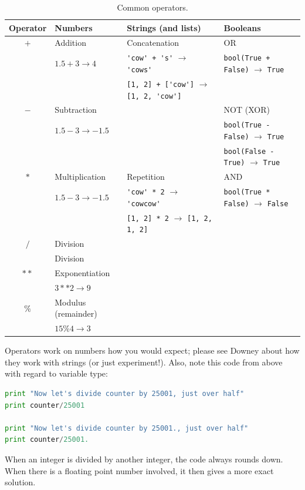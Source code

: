\documentclass[a4paper,10pt]{scrartcl}
\begin{document}
\begin{table}[!h]
\scriptsize
\begin{tabular}{clll}
Operator	& Numbers			& Strings (and lists)							& Booleans \\
\hline
$+$		& Addition			& Concatenation								&	OR 							\\
		& $1.5 + 3 \rightarrow 4$	& {\lstinline!'cow' + 's'!} $\rightarrow$ {\lstinline!'cows'!}		& {\lstinline!bool(True + False)!} $\rightarrow$ {\lstinline!True!} \\
		& 				& {\lstinline![1, 2] + ['cow']!} $\rightarrow$ {\lstinline![1, 2, 'cow']!}	& 								\\
$-$		& Subtraction			&									& 	NOT (XOR)						\\
		& $1.5 - 3 \rightarrow -1.5$	& 									& {\lstinline!bool(True - False)!} $\rightarrow$ {\lstinline!True!} \\
		& 				& 									& {\lstinline!bool(False - True)!} $\rightarrow$ {\lstinline!True!} \\
$*$		& Multiplication		& Repetition								& 	AND							\\
		& $1.5 - 3 \rightarrow -1.5$	& {\lstinline!'cow' * 2!} $\rightarrow$ {\lstinline!'cowcow'!}		& {\lstinline!bool(True * False)!} $\rightarrow$ {\lstinline!False!}\\
		& 				& {\lstinline![1, 2] * 2!} $\rightarrow$ {\lstinline![1, 2, 1, 2]!}		& 								\\
$/$		& Division			& 									& 								\\
		& Division			& 									& 								\\
$**$		& Exponentiation		& 									& 								\\
		& $3**2 \rightarrow 9$		& 									& 								\\
$\%$		& Modulus (remainder)		& 									& 								\\
		& $15 \% 4 \rightarrow 3$	& 									& 								
\end{tabular}
\caption{Common operators.}
\end{table}

Operators work on numbers how you would expect; please see Downey about how they work with strings (or just experiment!). Also, note this code from above with regard to variable type:
\begin{lstlisting}[belowskip=-1.6\baselineskip, language=python]
print "Now let's divide counter by 25001, just over half"
print counter/25001

print "Now let's divide counter by 25001., just over half"
print counter/25001.
\end{lstlisting}
When an integer is divided by another integer, the code always rounds down. When there is a floating point number involved, it then gives a more exact solution.
\end{document}
